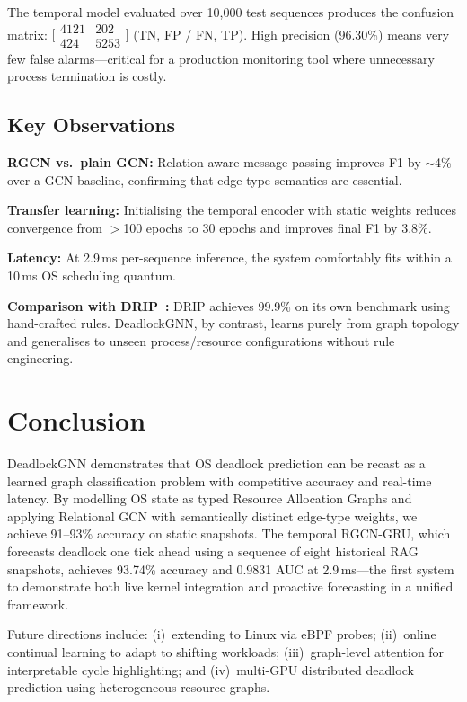\documentclass[conference]{IEEEtran}
\begin{document}
The temporal model evaluated over 10,000 test sequences produces the confusion
matrix:
$\bigl[\begin{smallmatrix} 4121 & 202 \\ 424 & 5253 \end{smallmatrix}\bigr]$
(TN, FP / FN, TP).
High precision (96.30\%) means very few false alarms—critical for a production
monitoring tool where unnecessary process termination is costly.

\subsection{Key Observations}

\textbf{RGCN vs.\ plain GCN:} Relation-aware message passing improves F1 by
$\sim$4\% over a GCN baseline, confirming that edge-type semantics are essential.

\textbf{Transfer learning:} Initialising the temporal encoder with static weights
reduces convergence from $>$100 epochs to 30 epochs and improves final F1 by 3.8\%.

\textbf{Latency:} At 2.9\,ms per-sequence inference, the system comfortably fits
within a 10\,ms OS scheduling quantum.

\textbf{Comparison with DRIP~\cite{drip2024}:} DRIP achieves 99.9\% on its own
benchmark using hand-crafted rules. DeadlockGNN, by contrast, learns purely
from graph topology and generalises to unseen process/resource configurations
without rule engineering.

\section{Conclusion}

DeadlockGNN demonstrates that OS deadlock prediction can be recast as a learned
graph classification problem with competitive accuracy and real-time latency.
By modelling OS state as typed Resource Allocation Graphs and applying Relational
GCN with semantically distinct edge-type weights, we achieve 91–93\% accuracy on
static snapshots. The temporal RGCN-GRU, which forecasts deadlock one tick ahead
using a sequence of eight historical RAG snapshots, achieves 93.74\% accuracy and
0.9831 AUC at 2.9\,ms—the first system to demonstrate both live kernel integration
and proactive forecasting in a unified framework.

Future directions include: (i)~extending to Linux via eBPF probes; (ii)~online
continual learning to adapt to shifting workloads; (iii)~graph-level attention
for interpretable cycle highlighting; and (iv)~multi-GPU distributed deadlock
prediction using heterogeneous resource graphs.
\end{document}
